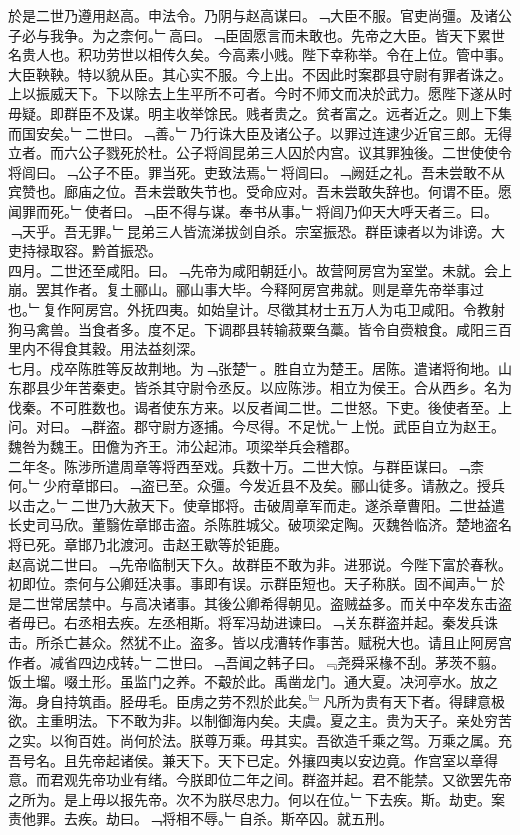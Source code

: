 \documentclass{zhvt-classic}
\begin{document}
\hspace*{2em}於是二世乃遵用赵高。申法令。乃阴与赵高谋曰。﹁大臣不服。官吏尚彊。及诸公子必与我争。为之柰何。﹂高曰。﹁臣固愿言而未敢也。先帝之大臣。皆天下累世名贵人也。积功劳世以相传久矣。今高素小贱。陛下幸称举。令在上位。管中事。大臣鞅鞅。特以貌从臣。其心实不服。今上出。不因此时案郡县守尉有罪者诛之。上以振威天下。下以除去上生平所不可者。今时不师文而决於武力。愿陛下遂从时毋疑。即群臣不及谋。明主收举馀民。贱者贵之。贫者富之。远者近之。则上下集而国安矣。﹂二世曰。﹁善。﹂乃行诛大臣及诸公子。以罪过连逮少近官三郎。无得立者。而六公子戮死於杜。公子将闾昆弟三人囚於内宫。议其罪独後。二世使使令将闾曰。﹁公子不臣。罪当死。吏致法焉。﹂将闾曰。﹁阙廷之礼。吾未尝敢不从宾赞也。廊庙之位。吾未尝敢失节也。受命应对。吾未尝敢失辞也。何谓不臣。愿闻罪而死。﹂使者曰。﹁臣不得与谋。奉书从事。﹂将闾乃仰天大呼天者三。曰。﹁天乎。吾无罪。﹂昆弟三人皆流涕拔剑自杀。宗室振恐。群臣谏者以为诽谤。大吏持禄取容。黔首振恐。\\
\hspace*{2em}四月。二世还至咸阳。曰。﹁先帝为咸阳朝廷小。故营阿房宫为室堂。未就。会上崩。罢其作者。复土郦山。郦山事大毕。今释阿房宫弗就。则是章先帝举事过也。﹂复作阿房宫。外抚四夷。如始皇计。尽徵其材士五万人为屯卫咸阳。令教射狗马禽兽。当食者多。度不足。下调郡县转输菽粟刍藁。皆令自赍粮食。咸阳三百里内不得食其穀。用法益刻深。\\
\hspace*{2em}七月。戍卒陈胜等反故荆地。为﹁张楚﹂。胜自立为楚王。居陈。遣诸将徇地。山东郡县少年苦秦吏。皆杀其守尉令丞反。以应陈涉。相立为侯王。合从西乡。名为伐秦。不可胜数也。谒者使东方来。以反者闻二世。二世怒。下吏。後使者至。上问。对曰。﹁群盗。郡守尉方逐捕。今尽得。不足忧。﹂上悦。武臣自立为赵王。魏咎为魏王。田儋为齐王。沛公起沛。项梁举兵会稽郡。\\
\hspace*{2em}二年冬。陈涉所遣周章等将西至戏。兵数十万。二世大惊。与群臣谋曰。﹁柰何。﹂少府章邯曰。﹁盗已至。众彊。今发近县不及矣。郦山徒多。请赦之。授兵以击之。﹂二世乃大赦天下。使章邯将。击破周章军而走。遂杀章曹阳。二世益遣长史司马欣。董翳佐章邯击盗。杀陈胜城父。破项梁定陶。灭魏咎临济。楚地盗名将已死。章邯乃北渡河。击赵王歇等於钜鹿。\\
\hspace*{2em}赵高说二世曰。﹁先帝临制天下久。故群臣不敢为非。进邪说。今陛下富於春秋。初即位。柰何与公卿廷决事。事即有误。示群臣短也。天子称朕。固不闻声。﹂於是二世常居禁中。与高决诸事。其後公卿希得朝见。盗贼益多。而关中卒发东击盗者毋已。右丞相去疾。左丞相斯。将军冯劫进谏曰。﹁关东群盗并起。秦发兵诛击。所杀亡甚众。然犹不止。盗多。皆以戌漕转作事苦。赋税大也。请且止阿房宫作者。减省四边戍转。﹂二世曰。﹁吾闻之韩子曰。﹃尧舜采椽不刮。茅茨不翦。饭土塯。啜土形。虽监门之养。不觳於此。禹凿龙门。通大夏。决河亭水。放之海。身自持筑臿。胫毋毛。臣虏之劳不烈於此矣。﹄凡所为贵有天下者。得肆意极欲。主重明法。下不敢为非。以制御海内矣。夫虞。夏之主。贵为天子。亲处穷苦之实。以徇百姓。尚何於法。朕尊万乘。毋其实。吾欲造千乘之驾。万乘之属。充吾号名。且先帝起诸侯。兼天下。天下已定。外攘四夷以安边竟。作宫室以章得意。而君观先帝功业有绪。今朕即位二年之间。群盗并起。君不能禁。又欲罢先帝之所为。是上毋以报先帝。次不为朕尽忠力。何以在位。﹂下去疾。斯。劫吏。案责他罪。去疾。劫曰。﹁将相不辱。﹂自杀。斯卒囚。就五刑。\\
\end{document}

